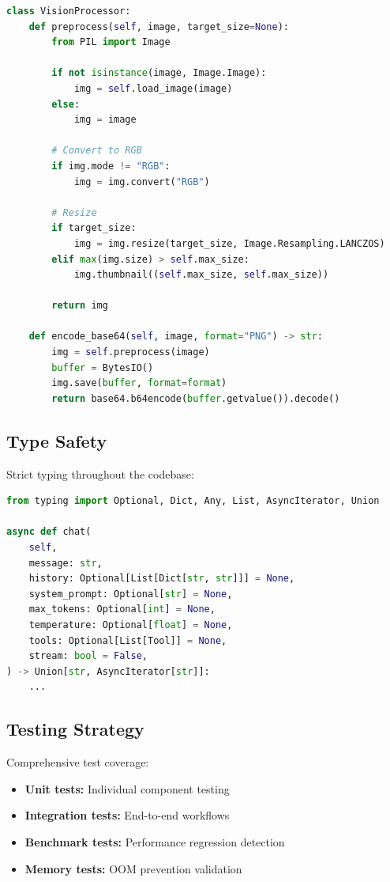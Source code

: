 \begin{lstlisting}[language=Python, caption=Vision Processing]
class VisionProcessor:
    def preprocess(self, image, target_size=None):
        from PIL import Image
        
        if not isinstance(image, Image.Image):
            img = self.load_image(image)
        else:
            img = image
        
        # Convert to RGB
        if img.mode != "RGB":
            img = img.convert("RGB")
        
        # Resize
        if target_size:
            img = img.resize(target_size, Image.Resampling.LANCZOS)
        elif max(img.size) > self.max_size:
            img.thumbnail((self.max_size, self.max_size))
        
        return img
    
    def encode_base64(self, image, format="PNG") -> str:
        img = self.preprocess(image)
        buffer = BytesIO()
        img.save(buffer, format=format)
        return base64.b64encode(buffer.getvalue()).decode()
\end{lstlisting}

\subsection{Type Safety}

Strict typing throughout the codebase:

\begin{lstlisting}[language=Python, caption=Type Annotations]
from typing import Optional, Dict, Any, List, AsyncIterator, Union

async def chat(
    self,
    message: str,
    history: Optional[List[Dict[str, str]]] = None,
    system_prompt: Optional[str] = None,
    max_tokens: Optional[int] = None,
    temperature: Optional[float] = None,
    tools: Optional[List[Tool]] = None,
    stream: bool = False,
) -> Union[str, AsyncIterator[str]]:
    ...
\end{lstlisting}

\subsection{Testing Strategy}

Comprehensive test coverage:

\begin{itemize}
    \item \textbf{Unit tests:} Individual component testing
    \item \textbf{Integration tests:} End-to-end workflows
    \item \textbf{Benchmark tests:} Performance regression detection
    \item \textbf{Memory tests:} OOM prevention validation
\end{itemize}

